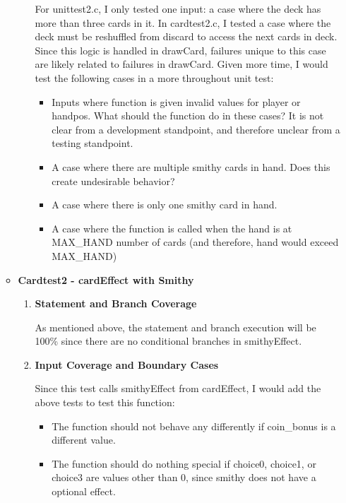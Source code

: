\documentclass[11pt,letterpaper]{article}
\begin{document}
\begin{enumerate}[label=\Roman*.]
\begin{itemize}[leftmargin=*]
\begin{enumerate}[leftmargin=*]
          For unittest2.c, I only tested one input: a case where the deck has more
            than three cards in it. In cardtest2.c, I tested a case where the deck must be
            reshuffled from discard to access the next cards in deck. Since this logic
            is handled in drawCard, failures unique to this case are likely related to 
            failures in drawCard. Given more time, I would test the following cases in a
            more throughout unit test:
          \begin{itemize}
            \item Inputs where function is given invalid values for player or handpos. What
                should the function do in these cases? It is not clear from a development
                standpoint, and therefore unclear from a testing standpoint. 
            \item A case where there are multiple smithy cards in hand. Does this create
              undesirable behavior?
            \item A case where there is only one smithy card in hand.
            \item A case where the function is called when the hand is at MAX\_HAND number of cards (and therefore, hand would exceed MAX\_HAND)
          \end{itemize}
        \end{enumerate}

      \item \textbf{Cardtest2 - cardEffect with Smithy}
        \begin{enumerate}[leftmargin=*]
          \item \textbf{Statement and Branch Coverage}
          
          As mentioned above, the statement and branch execution will be
          100\% since there are no conditional branches in smithyEffect.

        \item \textbf{Input Coverage and Boundary Cases}
          
          Since this test calls smithyEffect from cardEffect, I would add the above tests
            to test this function:
          \begin{itemize}
            \item The function should not behave any differently if coin\_bonus is 
              a different value. 
            \item The function should do nothing special if choice0, choice1, or choice3 
              are values other than 0, since smithy does not have a optional effect.
          \end{itemize}
        \end{enumerate}


\end{itemize}
\end{enumerate}
\end{document}
